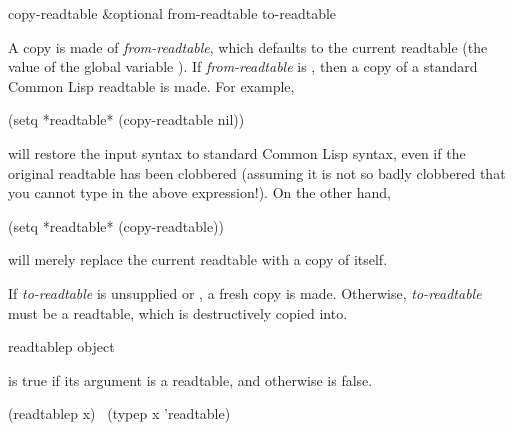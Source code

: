\begin{defun}[Function]
copy-readtable &optional from-readtable to-readtable

A copy is made of \emph{from-readtable}, which defaults to the current readtable
(the value of the global variable ).  If \emph{from-readtable}
is {\false}, then a copy of a standard Common Lisp readtable is made.
For example,
\begin{lisp}
(setq *readtable* (copy-readtable nil))
\end{lisp}
will restore the input syntax to standard Common Lisp syntax, even if
the original readtable has been clobbered (assuming it is not so
badly clobbered that you cannot type in the above expression!).
On the other hand,
\begin{lisp}
(setq *readtable* (copy-readtable))
\end{lisp}
will merely replace the current readtable with a copy of itself.

If \emph{to-readtable} is unsupplied or {\false}, a fresh copy is made.  Otherwise,
\emph{to-readtable} must be a readtable, which is destructively copied into.
\end{defun}

\begin{defun}[Function]
readtablep object

 is true if its argument is a readtable,
and otherwise is false.
\begin{lisp}
(readtablep x) \EQ\ (typep x 'readtable)
\end{lisp}
\end{defun}

